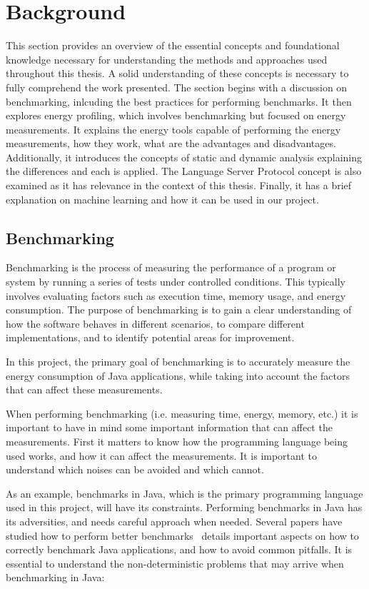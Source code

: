 \chapter{Background}\label{chapter:background}

This section provides an overview of the essential concepts and foundational knowledge necessary for understanding the methods and approaches used throughout this thesis. A solid understanding of these concepts is necessary to fully comprehend the work presented. The section begins with a discussion on benchmarking, inlcuding the best practices for performing benchmarks. It then explores energy profiling, which involves benchmarking but focused on energy measurements. It explains the energy tools capable of performing the energy measurements, how they work, what are the advantages and disadvantages. Additionally, it introduces the concepts of static and dynamic analysis explaining the differences and each is applied. The Language Server Protocol concept is also examined as it has relevance in the context of this thesis. Finally, it has a brief explanation on machine learning and how it can be used in our project.


\section{Benchmarking} \label{sec:background_benchmarking}

Benchmarking is the process of measuring the performance of a program or system by running a series of tests under controlled conditions. This typically involves evaluating factors such as execution time, memory usage, and energy consumption. The purpose of benchmarking is to gain a clear understanding of how the software behaves in different scenarios, to compare different implementations, and to identify potential areas for improvement.

In this project, the primary goal of benchmarking is to accurately measure the energy consumption of Java applications, while taking into account the factors that can affect these measurements.

When performing benchmarking (i.e. measuring time, energy, memory, etc.) it is important to have in mind some important information that can affect the measurements. First it matters to know how the programming language being used works, and how it can affect the measurements. It is important to understand which noises can be avoided and which cannot.

As an example, benchmarks in Java, which is the primary programming language used in this project, will have its constraints. Performing benchmarks in Java has its adversities, and needs careful approach when needed. Several papers have studied how to perform better benchmarks~\cite{10.1145/1297027.1297033,10.1145/1167515.1167488} details important aspects on how to correctly benchmark Java applications, and how to avoid common pitfalls.
It is essential to understand the non-deterministic problems that may arrive when benchmarking in Java:


